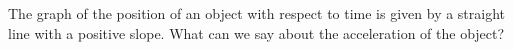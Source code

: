 \documentclass{ximera}
\begin{document}
\begin{problem}

  The graph of the position of an object with respect to time is given
  by a straight line with a positive slope.  What can we say about the
  acceleration of the object?
  \begin{multipleChoice}
  \end{multipleChoice}
\end{problem}
\end{document}
